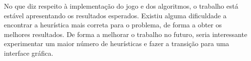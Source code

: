 \documentclass[conference]{IEEEtran}
\begin{document}
No que diz respeito \`a implementa\c c\~ao do jogo e dos algoritmos, o trabalho est\'a est\'avel apresentando os resultados esperados. Existiu alguma dificuldade a encontrar a heur\'istica mais correta para o problema, de forma a obter os melhores resultados. De forma a melhorar o trabalho no futuro, seria interessante experimentar um maior n\'umero de heur\'isticas e fazer a transi\c c\~ao para uma interface gr\'afica.





\end{document}
